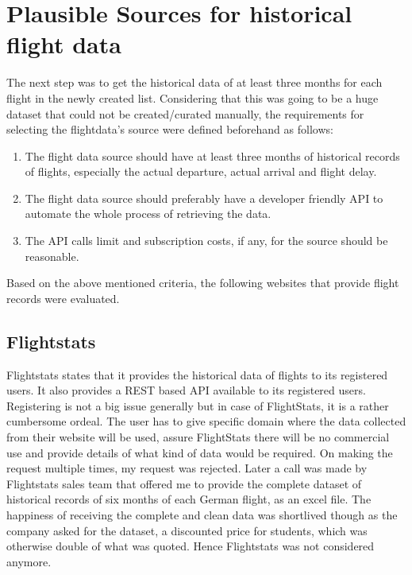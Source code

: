 \section{Plausible Sources for historical flight data}
The next step was to get the historical data of at least three months for each flight in the newly created list. Considering that this was going to be a huge dataset that could not be created/curated manually, the requirements for selecting the flightdata's source were defined beforehand as follows:
\begin{enumerate}
    \item The flight data source should have at least three months of historical records of flights, especially the actual departure, actual arrival and flight delay.
    \item The flight data source should preferably have a developer friendly API to automate the whole process of retrieving the data.
    \item The API calls limit and subscription costs, if any, for the source should be reasonable.
\end{enumerate}

Based on the above mentioned criteria, the following websites that provide flight records were evaluated.

\subsection{Flightstats}
Flightstats states that it provides the historical data of flights to its registered users. It also provides a REST based API available to its registered users. Registering is not a big issue generally but in case of FlightStats, it is a rather cumbersome ordeal. The user has to give specific domain where the data collected from their website will be used, assure FlightStats there will be no commercial use and provide details of what kind of data would be required. On making the request multiple times, my request was rejected. Later a call was made by Flightstats sales team that offered me to provide the complete dataset of historical records of six months of each German flight, as an excel file. The happiness of receiving the complete and clean data was shortlived though as the company asked  for the dataset, a discounted price for students, which was otherwise double of what was quoted. Hence Flightstats was not considered anymore.

